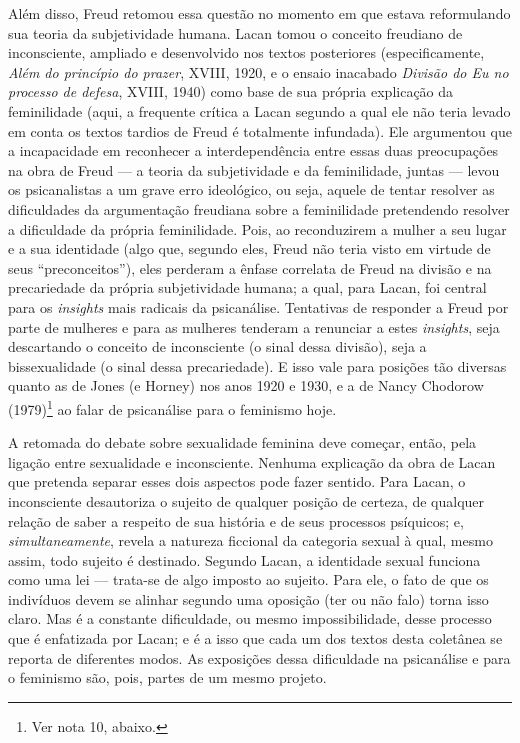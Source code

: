 Além disso, Freud retomou essa questão no momento em que estava
reformulando sua teoria da subjetividade humana. Lacan tomou o conceito
freudiano de inconsciente, ampliado e desenvolvido nos textos
posteriores (especificamente, \emph{Além do princípio do prazer}, XVIII,
1920, e o ensaio inacabado \emph{Divisão do Eu no processo de defesa},
XVIII, 1940) como base de sua própria explicação da feminilidade (aqui,
a frequente crítica a Lacan segundo a qual ele não teria levado em conta
os textos tardios de Freud é totalmente infundada). Ele argumentou que a
incapacidade em reconhecer a interdependência entre essas duas
preocupações na obra de Freud --- a teoria da subjetividade e da
feminilidade, juntas --- levou os psicanalistas a um grave erro
ideológico, ou seja, aquele de tentar resolver as dificuldades da
argumentação freudiana sobre a feminilidade pretendendo resolver a
dificuldade da própria feminilidade. Pois, ao reconduzirem a mulher a
seu lugar e a sua identidade (algo que, segundo eles, Freud não teria
visto em virtude de seus ``preconceitos''), eles perderam a ênfase
correlata de Freud na divisão e na precariedade da própria subjetividade
humana; a qual, para Lacan, foi central para os \emph{insights} mais
radicais da psicanálise. Tentativas de responder a Freud por parte de
mulheres e para as mulheres tenderam a renunciar a estes
\emph{insights}, seja descartando o conceito de inconsciente (o sinal
dessa divisão), seja a bissexualidade (o sinal dessa precariedade). E
isso vale para posições tão diversas quanto as de Jones (e Horney) nos
anos 1920 e 1930, e a de Nancy Chodorow (1979)\footnote{Ver nota 10,
  abaixo.} ao falar de psicanálise para o feminismo hoje.

A retomada do debate sobre sexualidade feminina deve começar, então,
pela ligação entre sexualidade e inconsciente. Nenhuma explicação da
obra de Lacan que pretenda separar esses dois aspectos pode fazer
sentido. Para Lacan, o inconsciente desautoriza o sujeito de qualquer
posição de certeza, de qualquer relação de saber a respeito de sua
história e de seus processos psíquicos; e, \emph{simultaneamente},
revela a natureza ficcional da categoria sexual à qual, mesmo assim,
todo sujeito é destinado. Segundo Lacan, a identidade sexual funciona
como uma lei --- trata-se de algo imposto ao sujeito. Para ele, o fato de
que os indivíduos devem se alinhar segundo uma oposição (ter ou não
falo) torna isso claro. Mas é a constante dificuldade, ou mesmo
impossibilidade, desse processo que é enfatizada por Lacan; e é a isso
que cada um dos textos desta coletânea se reporta de diferentes modos.
As exposições dessa dificuldade na psicanálise e para o feminismo são,
pois, partes de um mesmo projeto.

